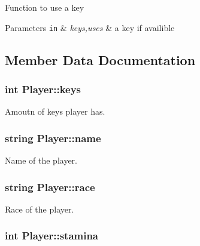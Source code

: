Function to use a key 
\begin{DoxyParams}[1]{Parameters}
\mbox{\tt in}  & {\em keys,uses} & a key if availible \\
\hline
\end{DoxyParams}


\subsection{Member Data Documentation}
\hypertarget{classPlayer_ac46baa685ca2a266178f03b9e9877e65}{
\subsubsection[{keys}]{\setlength{\rightskip}{0pt plus 5cm}int Player\-::keys\hspace{0.3cm}{\ttfamily [private]}}}\label{classPlayer_ac46baa685ca2a266178f03b9e9877e65}


Amoutn of keys player has. 

\hypertarget{classPlayer_acf0355128a99ee20ad9931b760fb2de1}{
\subsubsection[{name}]{\setlength{\rightskip}{0pt plus 5cm}string Player\-::name\hspace{0.3cm}{\ttfamily [private]}}}\label{classPlayer_acf0355128a99ee20ad9931b760fb2de1}


Name of the player. 

\hypertarget{classPlayer_a5130cb6c4233cd7ad1212af0d1790e58}{
\subsubsection[{race}]{\setlength{\rightskip}{0pt plus 5cm}string Player\-::race\hspace{0.3cm}{\ttfamily [private]}}}\label{classPlayer_a5130cb6c4233cd7ad1212af0d1790e58}


Race of the player. 

\hypertarget{classPlayer_a3642fc1d242a769a2ea76dc0b1662a20}{
\subsubsection[{stamina}]{\setlength{\rightskip}{0pt plus 5cm}int Player\-::stamina\hspace{0.3cm}{\ttfamily [private]}}}\label{classPlayer_a3642fc1d242a769a2ea76dc0b1662a20}


